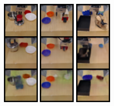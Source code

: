 \begin{figure}[t]
\begin{subfigure}[c]{0.3\textwidth}
{            %
            \includegraphics[width=0.2\textwidth]{val/imgs/samples/real_new/s3.png}
            \includegraphics[width=0.2\textwidth]{val/imgs/samples/real_new/s4.png}
            \includegraphics[width=0.2\textwidth]{val/imgs/samples/real_new/s5.png}
}
\end{subfigure}
\end{figure}

